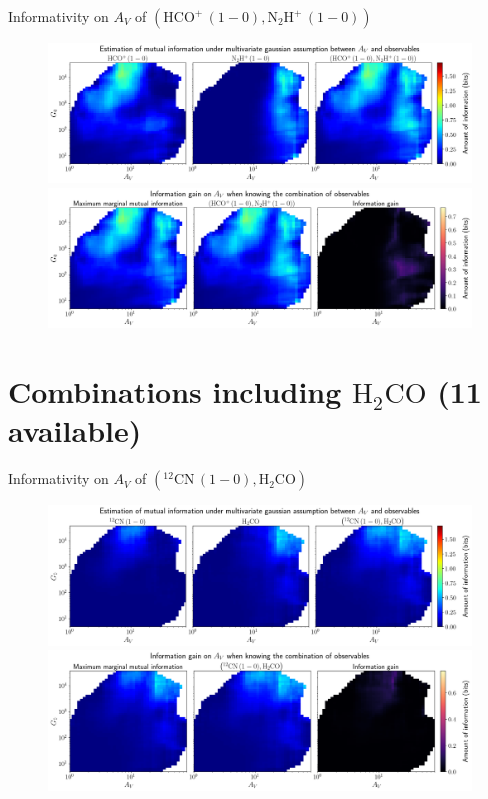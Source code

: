 \documentclass{beamer}
\begin{document}
\begin{frame}{Informativity on $A_V$ of $\left(\mathrm{HCO^+\,(1-0)},\mathrm{N_2H^+\,(1-0)}\right)$}
    \begin{figure}
        \centering
        \includegraphics[width=0.95\linewidth]{../linearinfogauss/av__hcop10_n2hp10_linearinfogauss.png}
        \vfill
        \includegraphics[width=0.95\linewidth]{../linearinfogauss/av__hcop10_n2hp10_linearinfogauss_gain.png}
    \end{figure}
\end{frame}

\section{Combinations including $\mathrm{H_2CO}$ (11 available)}

\begin{frame}{Informativity on $A_V$ of $\left(\mathrm{^{12}CN\,(1-0)},\mathrm{H_2CO}\right)$}
    \begin{figure}
        \centering
        \includegraphics[width=0.95\linewidth]{../linearinfogauss/av__12cn10_h2co_linearinfogauss.png}
        \vfill
        \includegraphics[width=0.95\linewidth]{../linearinfogauss/av__12cn10_h2co_linearinfogauss_gain.png}
    \end{figure}
\end{frame}
\end{document}
